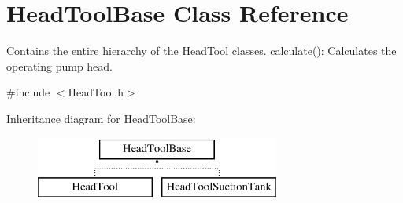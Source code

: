 \hypertarget{class_head_tool_base}{}\section{Head\+Tool\+Base Class Reference}
\label{class_head_tool_base}


Contains the entire hierarchy of the \hyperlink{class_head_tool}{Head\+Tool} classes. \hyperlink{class_head_tool_base_ab8df8f908827ce45dc5e769ea0e10f0b}{calculate()}\+: Calculates the operating pump head.  




{\ttfamily \#include $<$Head\+Tool.\+h$>$}

Inheritance diagram for Head\+Tool\+Base\+:\begin{figure}[H]
\begin{center}
\leavevmode
\includegraphics[height=2.000000cm]{d5/dc5/class_head_tool_base}
\end{center}
\end{figure}
